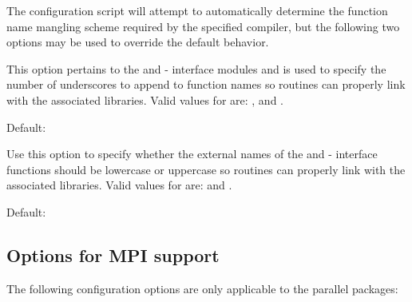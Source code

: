 \noindent The configuration script will attempt to automatically determine the
function name mangling scheme required by the specified {\F} compiler, but the
following two options may be used to override the default behavior.

\begin{config}

\item {}

  This option pertains to the {\fkinsol} and {\fcvode} {\F}-{\C} interface
  modules and is used to specify the number of underscores to append to
  function names so {\F} routines can properly link with the associated
  {\sundials} libraries. Valid values for  are: , 
  and .

  Default: 

\item {}

  Use this option to specify whether the external names of the {\fkinsol} and
  {\fcvode} {\F}-{\C} interface functions should be lowercase or uppercase so
  {\F} routines can properly link with the associated {\sundials} libraries. 
  Valid values for  are:  and .

  Default: 

\end{config}



\subsection*{Options for MPI support}

\noindent The following configuration options are only applicable to the parallel {\sundials} packages:

